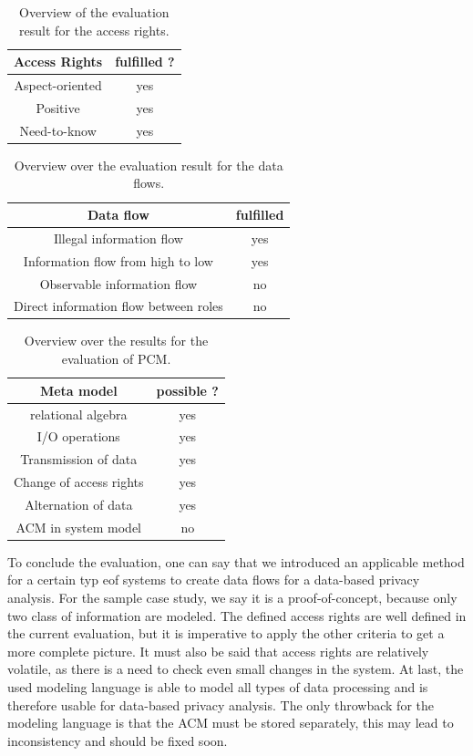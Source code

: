 \begin{table}
\begin{tabular}{|c|c|}
\hline 
Access Rights & fulfilled ? \\ 
\hline 
Aspect-oriented & yes \\ 
\hline 
Positive & yes \\ 
\hline 
Need-to-know & yes \\ 
\hline 
\end{tabular} 
\caption{Overview of the evaluation result for the access rights.}
\label{eval_AR}
\end{table}

\begin{table}
\begin{tabular}{|c|c|}
\hline 
Data flow & fulfilled \\ 
\hline 
Illegal information flow & yes \\ 
\hline 
Information flow from high to low & yes \\ 
\hline 
Observable information  flow & no \\ 
\hline 
Direct information flow between roles & no \\ 
\hline 
\end{tabular} 
\caption{Overview over the evaluation result for the data flows.}
\label{eval_DF}
\end{table}
 
\begin{table}
\begin{tabular}{|c|c|}
\hline 
Meta model  & possible ? \\ 
\hline 
relational algebra & yes \\ 
\hline 
I/O operations & yes \\ 
\hline 
Transmission of data & yes \\ 
\hline 
Change of access rights & yes \\ 
\hline 
Alternation of data & yes \\ 
\hline 
ACM in system model & no \\
\hline
\end{tabular} 
\caption{Overview over the results for the evaluation of PCM.}
\label{eval_MM}
\end{table}
To conclude the evaluation, one can say that we introduced an applicable method for a certain typ eof systems to create data flows for a data-based privacy analysis. For the sample case study, we say it is a proof-of-concept, because only two class of information are modeled. The defined access rights are well defined in the current evaluation, but it is imperative to apply the other criteria to get a more complete picture. It must also be said that access rights are relatively volatile, as there is a need to check even small changes in the system. At last, the used modeling language is able to model all types of data processing and is therefore usable for data-based privacy analysis. The only throwback for the modeling language is that the ACM must be stored separately, this may lead to inconsistency and should be fixed soon.
